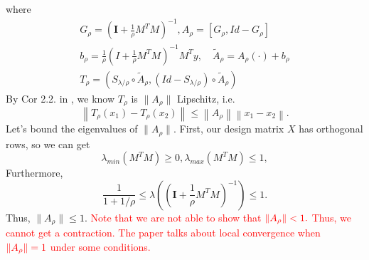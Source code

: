 \documentclass{article}
\begin{document}
where
\begin{equation}
    \begin{aligned}
        G_{\rho} = \left(\mathbf{I}+\frac{1}{\rho}M^TM\right)^{-1}, A_{\rho} = [G_{\rho}, Id-G_{\rho}]\\
        b_{\rho} = \frac{1}{\rho}\left(I+\frac{1}{\rho}M^TM\right)^{-1}M^Ty,\quad \widetilde{A}_{\rho} = A_{\rho}(\cdot)+b_{\rho}\\
        T_{\rho} = \left(S_{\lambda/\rho}\circ\widetilde{A}_{\rho}, (Id - S_{\lambda/\rho})\circ\widetilde{A}_{\rho}\right)
    \end{aligned}
\end{equation}
By Cor 2.2. in \cite{dohmatob2016local}, we know $T_{\rho}$ is $\|A_{\rho}\|$ Lipschitz, i.e.
\begin{equation}
    \left\|T_\rho\left(x_1\right)-T_\rho\left(x_2\right)\right\| \leq\left\|A_\rho\right\|\left\|x_1-x_2\right\|.
\end{equation}
Let's bound the eigenvalues of $\|A_{\rho}\|$. First, our design matrix $X$ has orthogonal rows, so we can get
\begin{equation}
    \lambda_{min}(M^TM)\geq 0,  \lambda_{max}(M^TM)\leq 1,
\end{equation}
Furthermore,
\begin{equation}
    \frac{1}{1+1/\rho}\leq\lambda\left(\left(\mathbf{I}+\frac{1}{\rho}M^TM\right)^{-1}\right)\leq 1.
\end{equation}
Thus, $\|A_{\rho}\|\leq 1$. \textcolor{red}{Note that we are not able to show that }$\color{red}\|A_{\rho}\|< 1.$ \textcolor{red}{Thus, we cannot get a contraction. The paper talks about local convergence when } $\color{red}\|A_{\rho}\|= 1$\textcolor{red}{ under some conditions.}
\end{document}
